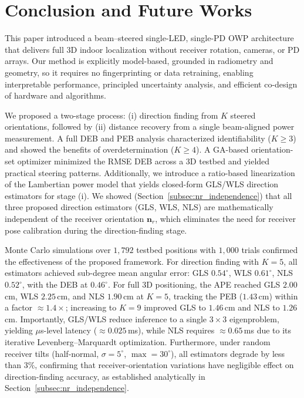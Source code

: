 \documentclass[journal]{IEEEtran}
\begin{document}
\section{Conclusion and Future Works}
\label{sec:Conclusion}

This paper introduced a beam–steered single-LED, single-PD OWP architecture that delivers full 3D indoor localization without receiver rotation, cameras, or PD arrays. Our method is explicitly model-based, grounded in radiometry and geometry, so it requires no fingerprinting or data retraining, enabling interpretable performance, principled uncertainty analysis, and efficient co-design of hardware and algorithms.

We proposed a two-stage process: (i) direction finding from \(K\) steered orientations, followed by (ii) distance recovery from a single beam-aligned power measurement. A full DEB and PEB analysis characterized identifiability (\(K\!\ge\!3\)) and showed the benefits of overdetermination (\(K\!\ge\!4\)). A GA-based orientation-set optimizer minimized the RMSE DEB across a 3D testbed and yielded practical steering patterns. Additionally, we introduce a ratio-based linearization of the Lambertian power model that yields closed-form GLS/WLS direction estimators for stage (i). We showed (Section~\ref{subsec:nr_independence}) that all three proposed direction estimators (GLS, WLS, NLS) are mathematically independent of the receiver orientation $\mathbf{n}_r$, which eliminates the need for receiver pose calibration during the direction-finding stage.

Monte Carlo simulations over $1{,}792$ testbed positions with $1{,}000$ trials confirmed the effectiveness of the proposed framework. For direction finding with $K=5$, all estimators achieved sub-degree mean angular error: GLS $0.54^\circ$, WLS $0.61^\circ$, NLS $0.52^\circ$, with the DEB at $0.46^\circ$. For full 3D positioning, the APE reached GLS $2.00$\,cm, WLS $2.25$\,cm, and NLS $1.90$\,cm at $K=5$, tracking the PEB ($1.43$\,cm) within a factor $\approx1.4\times$; increasing to $K=9$ improved GLS to $1.46$\,cm and NLS to $1.26$\,cm. Importantly, GLS/WLS reduce inference to a single $3\times3$ eigenproblem, yielding $\mu$s-level latency ($\approx0.025$\,ms), while NLS requires $\approx0.65$\,ms due to its iterative Levenberg--Marquardt optimization. Furthermore, under random receiver tilts (half-normal, $\sigma=5^\circ$, $\max=30^\circ$), all estimators degrade by less than $3\%$, confirming that receiver-orientation variations have negligible effect on direction-finding accuracy, as established analytically in Section~\ref{subsec:nr_independence}.
\end{document}
